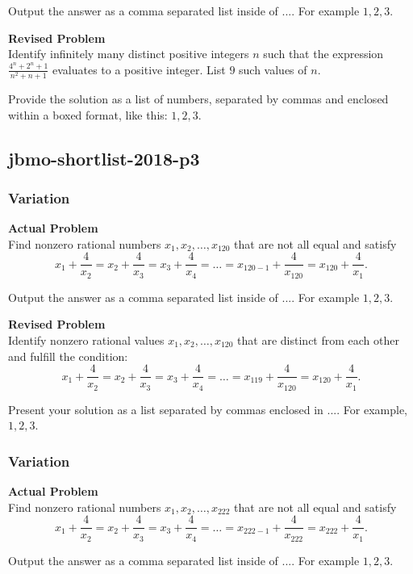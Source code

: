 Output the answer as a comma separated list inside of $\boxed{...}$. For example $\boxed{1, 2, 3}$.

\textbf{Revised Problem}\\
Identify infinitely many distinct positive integers \( n \) such that the expression \(\frac{4^n + 2^n + 1}{n^2 + n + 1}\) evaluates to a positive integer. List \( 9 \) such values of \( n \).

Provide the solution as a list of numbers, separated by commas and enclosed within a boxed format, like this: \(\boxed{1, 2, 3}\).

\subsection{jbmo-shortlist-2018-p3}
\subsubsection{Variation}
\textbf{Actual Problem}\\
Find nonzero rational numbers $x_1,x_2,\ldots,x_{120}$ that are not all equal and satisfy 
$$x_1+\frac{4}{x_2}=x_2+\frac{4}{x_3}=x_3+\frac{4}{x_4}=\ldots=x_{120-1}+\frac{4}{x_{120}}=x_{120}+\frac{4}{x_1}.$$

Output the answer as a comma separated list inside of $\boxed{...}$. For example $\boxed{1, 2, 3}$.

\textbf{Revised Problem}\\
Identify nonzero rational values $x_1, x_2, \ldots, x_{120}$ that are distinct from each other and fulfill the condition:
$$x_1 + \frac{4}{x_2} = x_2 + \frac{4}{x_3} = x_3 + \frac{4}{x_4} = \ldots = x_{119} + \frac{4}{x_{120}} = x_{120} + \frac{4}{x_1}.$$

Present your solution as a list separated by commas enclosed in $\boxed{...}$. For example, $\boxed{1, 2, 3}$.

\subsubsection{Variation}
\textbf{Actual Problem}\\
Find nonzero rational numbers $x_1,x_2,\ldots,x_{222}$ that are not all equal and satisfy 
$$x_1+\frac{4}{x_2}=x_2+\frac{4}{x_3}=x_3+\frac{4}{x_4}=\ldots=x_{222-1}+\frac{4}{x_{222}}=x_{222}+\frac{4}{x_1}.$$

Output the answer as a comma separated list inside of $\boxed{...}$. For example $\boxed{1, 2, 3}$.

